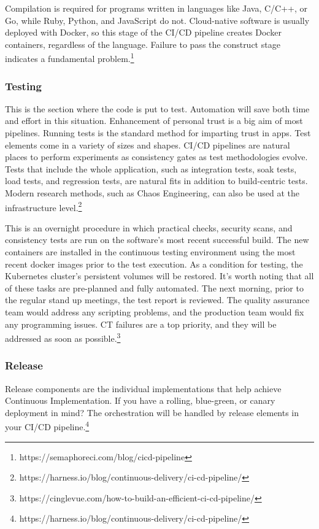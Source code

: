 Compilation is required for programs written in languages like Java, C/C++, or Go, while Ruby, Python, and JavaScript do not. Cloud-native software is usually deployed with Docker, so this stage of the CI/CD pipeline creates Docker containers, regardless of the language. Failure to pass the construct stage indicates a fundamental problem.\footnote{https://semaphoreci.com/blog/cicd-pipeline}


\subsubsection{Testing}


This is the section where the code is put to test. Automation will save both time and effort in this situation. Enhancement of personal trust is a big aim of most pipelines. Running tests is the standard method for imparting trust in apps. Test elements come in a variety of sizes and shapes. CI/CD pipelines are natural places to perform experiments as consistency gates as test methodologies evolve. Tests that include the whole application, such as integration tests, soak tests, load tests, and regression tests, are natural fits in addition to build-centric tests. Modern research methods, such as Chaos Engineering, can also be used at the infrastructure level.\footnote{https://harness.io/blog/continuous-delivery/ci-cd-pipeline/}

This is an overnight procedure in which practical checks, security scans, and consistency tests are run on the software's most recent successful build. The new containers are installed in the continuous testing environment using the most recent docker images prior to the test execution. As a condition for testing, the Kubernetes cluster's persistent volumes will be restored. It's worth noting that all of these tasks are pre-planned and fully automated. The next morning, prior to the regular stand up meetings, the test report is reviewed. The quality assurance team would address any scripting problems, and the production team would fix any programming issues. CT failures are a top priority, and they will be addressed as soon as possible.\footnote{https://cinglevue.com/how-to-build-an-efficient-ci-cd-pipeline/}

\subsubsection{Release}


Release components are the individual implementations that help achieve Continuous Implementation. If you have a rolling, blue-green, or canary deployment in mind? The orchestration will be handled by release elements in your CI/CD pipeline.\footnote{https://harness.io/blog/continuous-delivery/ci-cd-pipeline/}

